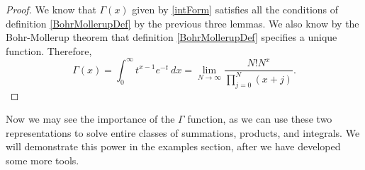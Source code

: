 \begin{proof}
We know that $\Gamma(x)$ given by \eqref{intForm} satisfies all the conditions of definition \eqref{BohrMollerupDef} by the previous three lemmas. 
We also know by the Bohr-Mollerup theorem that definition \eqref{BohrMollerupDef} specifies a unique function.
Therefore,
$$\Gamma(x) = \int_0^\infty t^{x-1} e^{-t} \ dx = \lim_{N \rightarrow \infty} \frac{N! N^x}{\prod_{j=0}^N (x+j)}.$$
\end{proof}

Now we may see the importance of the $\Gamma$ function, as we can use these two representations to solve entire classes of summations, products, and integrals.
We will demonstrate this power in the examples section, after we have developed some more tools.